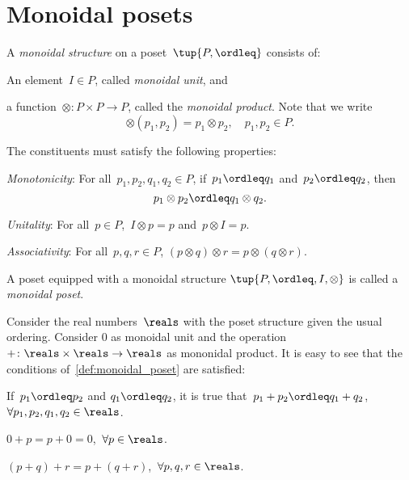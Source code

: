 

\section{Monoidal posets}\label{sec:parallelism-monoidal-posets}


\begin{definition}
    \label{def:monoidal_poset}
    A \emph{monoidal structure} on a poset~$\tup{P,\ordleq}$ consists of:
    \begin{compactenum}
        \item An element~$I\in P$, called \emph{monoidal unit}, and
        \item a function~$\otimes\colon P\times P\to P$, called the \emph{monoidal product}. Note that we write
        \begin{equation*}
            \otimes(p_1,p_2)=p_1\otimes p_2, \quad p_1,p_2\in P.
        \end{equation*}
    \end{compactenum}
    The constituents must satisfy the following properties:
    \begin{compactenum}[(a)]
        \item \emph{Monotonicity}: For all~$p_1,p_2,q_1,q_2\in P$, if~$p_1\ordleq q_1$ and~$p_2\ordleq q_2$, then
        \begin{equation*}
            p_1\otimes p_2\ordleq q_1\otimes q_2.
        \end{equation*}
        \item \emph{Unitality}: For all~$p\in P$,~$I\otimes p=p$ and~$p\otimes I=p$.
        \item \emph{Associativity}: For all~$p,q,r\in P$, $(p\otimes q)\otimes r=p\otimes (q\otimes r)$.
    \end{compactenum}
    A poset equipped with a monoidal structure $\tup{P,\ordleq,I,\otimes}$ is called a \emph{monoidal poset}.
\end{definition}

\begin{example}
    \label{ex:monoidal_pos_reals}
    Consider the real numbers~$\reals$ with the poset structure given the usual ordering. Consider 0 as monoidal unit and the operation~$+\colon \reals\times \reals\to \reals$ as mononidal product. It is easy to see that the conditions of~\cref{def:monoidal_poset} are satisfied:
    \begin{compactenum}[(a)]
        \item If~$p_1\ordleq p_2$ and $q_1\ordleq q_2$, it is true that~$p_1+p_2\ordleq q_1+q_2$,~$\forall p_1,p_2,q_1,q_2\in \reals$.
        \item $0+p=p+0=0$,~$\forall p\in \reals$.
        \item $(p+q)+r=p+(q+r)$,~$\forall p,q,r\in \reals$.
    \end{compactenum}
\end{example}

